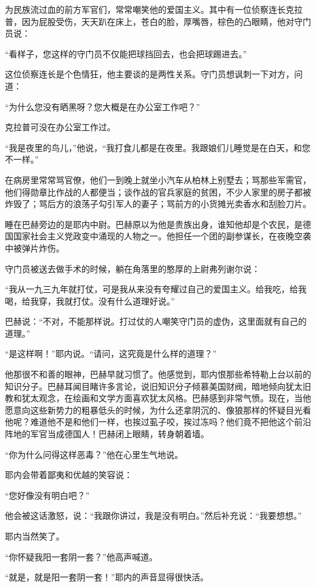 为民族流过血的前方军官们，常常嘲笑他的爱国主义。其中有一位侦察连长克拉普，因为屁股受伤，天天趴在床上，苍白的脸，厚嘴唇，棕色的凸眼睛，他对守门员说：

“看样子，您这样的守门员不仅能把球挡回去，也会把球踢进去。”

这位侦察连长是个色情狂，他主要谈的是两性关系。守门员想讽刺一下对方，问道：

“为什么您没有晒黑呀？您大概是在办公室工作吧？”

克拉普可没在办公室工作过。

“我是夜里的鸟儿，”他说，“我打食儿都是在夜里。我跟娘们儿睡觉是在白天，和您不一样。”

在病房里常常骂官僚，他们一到晚上就坐小汽车从柏林上别墅去；骂那些军需官，他们得勋章比作战的人都便当；谈作战的官兵家庭的贫困，不少人家里的房子都被炸毁了；骂后方的浪荡子勾引军人的妻子；骂前方的小货摊光卖香水和刮脸刀片。

睡在巴赫旁边的是耶内中尉。巴赫原以为他是贵族出身，谁知他却是个农民，是德国国家社会主义党政变中涌现的人物之一。他担任一个团的副参谋长，在夜晚空袭中被弹片炸伤。

守门员被送去做手术的时候，躺在角落里的憨厚的上尉弗列谢尔说：

“我从一九三九年就打仗，可是我从来没有夸耀过自己的爱国主义。给我吃，给我喝，给我穿，我就打仗。没有什么道理好说。”

巴赫说：“不对，不能那样说。打过仗的人嘲笑守门员的虚伪，这里面就有自己的道理。”

“是这样啊！”耶内说。“请问，这究竟是什么样的道理？”

他那很不和善的眼神，巴赫早就习惯了。他感觉到，耶内恨那些希特勒上台以前的知识分子。巴赫耳闻目睹许多言论，说旧知识分子倾慕美国财阀，暗地倾向犹太旧教和犹太观念，在绘画和文学方面喜欢犹太风格。巴赫感到非常气愤。现在，当他愿意向这些新势力的粗暴低头的时候，为什么还拿阴沉的、像狼那样的怀疑目光看他呢？难道他不是和他们一样，也挨过虱子咬，挨过冻吗？他们竟不把他这个前沿阵地的军官当成德国人！巴赫闭上眼睛，转身朝着墙。

“你为什么问得这样恶毒？”他在心里生气地说。

耶内会带着鄙夷和优越的笑容说：

“您好像没有明白吧？”

他会被这话激怒，说：“我跟你讲过，我是没有明白。”然后补充说：“我要想想。”

耶内当然笑了。

“你怀疑我阳一套阴一套？”他高声喊道。

“就是，就是阳一套阴一套！”耶内的声音显得很快活。

